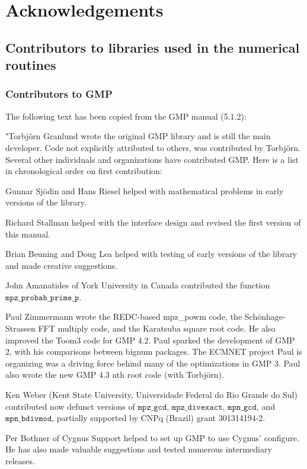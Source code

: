 \chapter{Acknowledgements} 

\section{Contributors to libraries used in the numerical routines}

\subsection{Contributors to GMP}
\label{Contributors to GMP}
The following text has been copied from the GMP manual (5.1.2):

\vpara
"Torbj\"orn Granlund wrote the original GMP library and is still the main
developer.  Code not explicitly attributed to others, was contributed by
Torbj\"orn.  Several other individuals and organizations have contributed
GMP.  Here is a list in chronological order on first contribution:

\vpara
Gunnar Sj\"odin and Hans Riesel helped with mathematical problems in early
versions of the library.

\vpara
Richard Stallman helped with the interface design and revised the first
version of this manual.

\vpara
Brian Beuning and Doug Lea helped with testing of early versions of the
library and made creative suggestions.

\vpara
John Amanatides of York University in Canada contributed the function
$\mathtt{mpz\_probab\_prime\_p}$.

\vpara
Paul Zimmermann wrote the REDC-based mpz\_powm code, the Sch\"onhage-Strassen
FFT multiply code, and the Karatsuba square root code.  He also improved the
Toom3 code for GMP 4.2.  Paul sparked the development of GMP 2, with his
comparisons between bignum packages.  The ECMNET project Paul is organizing
was a driving force behind many of the optimizations in GMP 3.  Paul also
wrote the new GMP 4.3 nth root code (with Torbj\"orn).

\vpara
Ken Weber (Kent State University, Universidade Federal do Rio Grande do Sul)
contributed now defunct versions of $\mathtt{mpz\_gcd}$, $\mathtt{mpz\_divexact}$,
$\mathtt{mpn\_gcd}$, and $\mathtt{mpn\_bdivmod}$, partially supported by CNPq (Brazil)
grant 301314194-2.

\vpara
Per Bothner of Cygnus Support helped to set up GMP to use Cygnus' configure.
He has also made valuable suggestions and tested numerous intermediary
releases.

